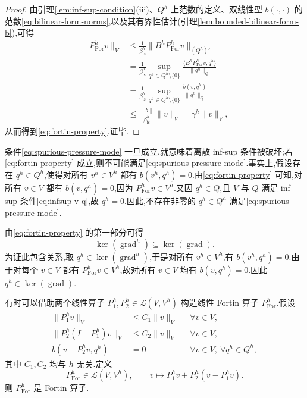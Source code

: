 \begin{proof}
由引理\ref{lem:inf-sup-condition}(iii)、$Q^h$ 上范数的定义、双线性型 $b(\cdot,\cdot)$ 的范数\cref{eq:bilinear-form-norms},以及其有界性估计(引理\ref{lem:bounded-bilinear-form-b}),可得
\[
\begin{aligned}
  \|P_{\mathrm{For}}^h v\|_V
  &\le \frac{1}{\beta_{\mathrm{is}}^h}
       \|B^hP_{\mathrm{For}}^h v\|_{(Q^h)'}\\
  &=\frac{1}{\beta_{\mathrm{is}}^h}
    \sup_{q^h\in Q^h\setminus\{0\}}
      \frac{\langle B^hP_{\mathrm{For}}^h v,q^h\rangle}
           {\|q^h\|_Q}\\
  &=\frac{1}{\beta_{\mathrm{is}}^h}
    \sup_{q^h\in Q^h\setminus\{0\}}
      \frac{b(v,q^h)}{\|q^h\|_Q}\\
  &\le \frac{\|b\|}{\beta_{\mathrm{is}}^h}\|v\|_V
   =\gamma^h\|v\|_V,
\end{aligned}
\]
从而得到\cref{eq:fortin-property}.证毕.
\end{proof}

\begin{note}[关于条件(3.76)]\label{note:fortin-excludes-spurious-pressure}
条件\cref{eq:spurious-pressure-mode} 一旦成立,就意味着离散 inf-sup 条件被破坏;若\cref{eq:fortin-property} 成立,则不可能满足\cref{eq:spurious-pressure-mode}.事实上,假设存在 $q^h\in Q^h$,使得对所有 $v^h\in V^h$ 都有 $b(v^h,q^h)=0$.由\cref{eq:fortin-property} 可知,对所有 $v\in V$ 都有 $b(v,q^h)=0$,因为 $P_{\mathrm{For}}^h v\in V^h$.又因 $q^h\in Q$,且 $V$ 与 $Q$ 满足 inf-sup 条件\cref{eq:infsup-v-q},故 $q^h=0$.因此,不存在非零的 $q^h\in Q^h$ 满足\cref{eq:spurious-pressure-mode}.
\end{note}

\begin{note}[梯度算子的核]\label{note:fortin-gradient-kernels}
由\cref{eq:fortin-property} 的第一部分可得
\[
  \ker(\operatorname{grad}^h)\subseteq\ker(\operatorname{grad}).
\]
为证此包含关系,取 $q^h\in\ker(\operatorname{grad}^h)$,于是对所有 $v^h\in V^h$,有 $b(v^h,q^h)=0$.由于对每个 $v\in V$ 都有 $P_{\mathrm{For}}^h v\in V^h$,故对所有 $v\in V$ 均有 $b(v,q^h)=0$.因此 $q^h\in\ker(\operatorname{grad})$.
\end{note}

\begin{note}\label{note:fortin-construction}
有时可以借助两个线性算子 $P_1^h,P_2^h\in\mathcal{L}(V,V^h)$ 构造线性 Fortin 算子 $P_{\mathrm{For}}^h$.假设
\begin{align}
  \|P_1^h v\|_V&\le C_1\|v\|_V
      &&\forall v\in V,\label{eq:fortin-p1-bound}\\
  \|P_2^h(I-P_1^h)v\|_V&\le C_2\|v\|_V
      &&\forall v\in V,\label{eq:fortin-p2-bound}\\
  b(v-P_2^h v,q^h)&=0
      &&\forall v\in V,\ \forall q^h\in Q^h,\label{eq:fortin-p2-moment}
\end{align}
其中 $C_1,C_2$ 均与 $h$ 无关.定义
\begin{equation}\label{eq:fortin-operator-construction}
  P_{\mathrm{For}}^h\in\mathcal{L}(V,V^h),
  \qquad
  v\longmapsto P_1^h v+P_2^h(v-P_1^h v).
\end{equation}
则 $P_{\mathrm{For}}^h$ 是 Fortin 算子.
\end{note}

